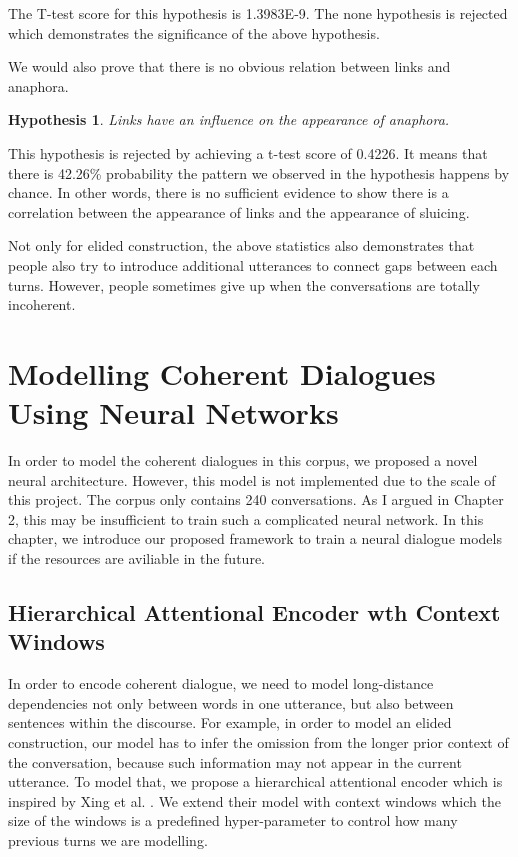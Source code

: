 \documentclass[bsc,frontabs,twoside,singlespacing,parskip,deptreport]{infthesis}     %
\newtheorem*{hypo}{Hypothesis}
\begin{document}
The T-test score for this hypothesis is 1.3983E-9. The none hypothesis is rejected which demonstrates the significance of the above hypothesis.

We would also prove that there is no obvious relation between links and anaphora.

\begin{hypo}
Links have an influence on the appearance of anaphora.
\end{hypo}

This hypothesis is rejected by achieving a t-test score of 0.4226. It means that there is 42.26\% probability the pattern we observed in the hypothesis happens by chance. In other words, there is no sufficient evidence to show there is a correlation between the appearance of links and the appearance of sluicing.

Not only for elided construction, the above statistics also demonstrates that people also try to introduce additional utterances to connect gaps between each turns. However, people sometimes give up when the conversations are totally incoherent.


\chapter{Modelling Coherent Dialogues Using Neural Networks}

In order to model the coherent dialogues in this corpus, we proposed a novel neural architecture. However, this model is not implemented due to the scale of this project. The corpus only contains 240 conversations. As I argued in Chapter 2, this may be insufficient to train such a complicated neural network. In this chapter, we introduce our proposed framework to train a neural dialogue models if the resources are aviliable in the future.

\section{Hierarchical Attentional Encoder wth Context Windows}

In order to encode coherent dialogue, we need to model long-distance dependencies not only between words in one utterance, but also between sentences within the discourse. For example, in order to model an elided construction, our model has to infer the omission from the longer prior context of the conversation, because such information may not appear in the current utterance. To model that, we propose a hierarchical attentional encoder which is inspired by Xing et al. \cite{xing2018hierarchical}. We extend their model with context windows which the size of the windows is a predefined hyper-parameter to control how many previous turns we are modelling. 
\end{document}
